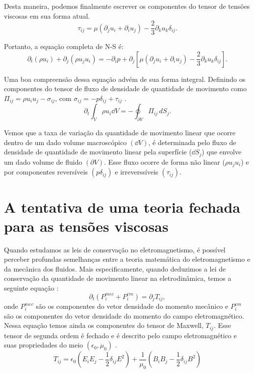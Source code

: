 Desta maneira, podemos finalmente escrever os componentes do tensor de tensões viscosas em sua forma atual.
\begin{equation}\label{tau_final}
\tau_{ij} = \mu\left(\partial_{j}u_{i} + \partial_{i}u_{j}\right) - \dfrac{2}{3}\partial_{k}u_{k}\delta_{ij}.
\end{equation}

Portanto, a equação completa de N-S é:
\begin{equation}\label{NS_final}
\partial_{t}(\rho u_{i})+ \partial_{j} (\rho u_{j}u_{i})= -\partial_{i}p + \partial_{j}\left[\mu\left(\partial_{j}u_{i} + \partial_{i}u_{j}\right) - \dfrac{2}{3}\partial_{k}u_{k}\delta_{ij}\right].
\end{equation}

Uma boa compreensão dessa equação advém de sua forma integral. Definindo os componentes do tensor de fluxo de densidade de quantidade de movimento como $\Pi_{ij} = \rho u_{i}u_{j} - \sigma_{ij}$, com $\sigma_{ij} = -p\delta_{ij} + \tau_{ij}$ \cite{landau2013fluid}. 
\begin{equation}\label{NS_integral}
\partial_{t}\int_{V}\rho u_{i} \dd V = -\oint_{\partial V} \Pi_{ij} \,dS_{j}.
\end{equation}

Vemos que a taxa de variação da quantidade de movimento linear que ocorre dentro de um dado volume macroscópico $(\dd V)$, é determinada pelo fluxo de densidade de quantidade de movimento linear pela superfície ($\dd S_{j}$) que envolve um dado volume de fluido $(\partial V)$. Esse fluxo ocorre de forma não linear ($\rho u_{j}u_{i} $) e por componentes reversíveis $(p\delta_{ij})$ e irreverssíveis $(\tau_{ij})$.

\section{A tentativa de uma teoria fechada para as tensões viscosas}
Quando estudamos as leis de conservação no eletromagnetismo, é possível perceber profundas semelhanças entre a teoria matemática do eletromagnetismo e da mecânica dos fluidos. Mais especificamente, quando deduzimos a lei de conservação da quantidade de movimento linear na eletrodinâmica, temos a seguinte equação \cite{griffiths2005introduction, jackson1999classical}:
\begin{equation}\label{equação_momento_el}
\partial_{t}(P_i^{mec} + P_i^{em}) = \partial_{j} T_{ij},
\end{equation}
onde $P_i^{mec}$ são os componentes do vetor densidade do momento mecânico e $P_i^{em}$ são os componentes do vetor densidade do momento do campo eletromagnético. Nessa equação temos ainda os componentes do tensor de Maxwell, $T_{ij}$. Esse tensor de segunda ordem é fechado e é descrito pelo campo eletromagnético e suas propriedades do meio $(\epsilon_{0}, \mu_{0})$ \cite{griffiths2005introduction, jackson1999classical}.
\begin{equation}\label{Tensor de maxwell}
T_{ij} = \epsilon_{0}\left(E_{i}E_{j} - \frac{1}{2}\delta_{ij}E^{2}\right) + \frac{1}{\mu_{0}}\left(B_{i}B_{j} - \frac{1}{2}\delta_{ij}B^{2}\right)
\end{equation}

